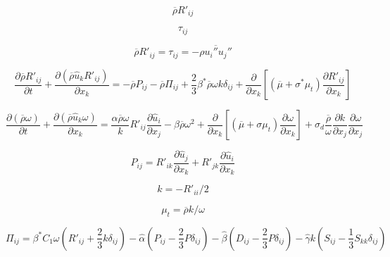 

\begin{equation}
\overline \rho R'_{ij}
\end{equation}

\begin{equation}
\tau_{ij}
\end{equation}

\begin{equation}
\overline \rho R'_{ij} = \tau_{ij} = -\overline {\rho u_i'' u_j''}
\end{equation}

\begin{equation}
\frac{\partial \overline \rho R'_{ij}}{\partial t} +
\frac{\partial (\overline \rho \hat u_k R'_{ij})}{\partial x_k} = -\overline \rho P_{ij} -
\overline \rho \Pi_{ij} + \frac{2}{3} \beta^* \overline \rho \omega k \delta_{ij} +
\frac{\partial}{\partial x_k} \left[ \left( \overline \mu + \sigma^* \mu_t \right)
\frac{\partial R'_{ij}}{\partial x_k} \right]
\end{equation}

\begin{equation}
\frac{\partial (\overline \rho \omega)}{\partial t} +
  \frac{\partial (\overline \rho \hat u_k \omega)}{\partial x_k}
  = \frac{\alpha \overline \rho \omega}{k} R'_{ij} \frac{\partial \hat u_i}{\partial x_j} -
  \beta \overline \rho \omega^2 + \frac{\partial}{\partial x_k}
  \left[ \left( \overline \mu + \sigma \mu_t \right)
  \frac{\partial \omega}{\partial x_k} \right] +
  \sigma_d \frac{\overline \rho}{\omega} \frac{\partial k}{\partial x_j}
  \frac{\partial \omega}{\partial x_j}
\end{equation}

\begin{equation}
P_{ij} = R'_{ik}
\frac{\partial \hat u_j}{\partial x_k}
+ R'_{jk} \frac{\partial \hat u_i}{\partial x_k}
\end{equation}

\begin{equation}
k=-R'_{ii}/2
\end{equation}

\begin{equation}
\mu_t = \overline \rho k / \omega
\end{equation}

\begin{equation}
\Pi_{ij} = \beta^* C_1 \omega \left( R'_{ij} +
  \frac{2}{3} k \delta_{ij} \right)
  - \hat \alpha \left( P_{ij} - \frac{2}{3} P \delta_{ij} \right)
  - \hat \beta \left( D_{ij} - \frac{2}{3} P \delta_{ij} \right)
  - \hat \gamma k \left( S_{ij} - \frac{1}{3} S_{kk} \delta_{ij} \right)
\end{equation}

